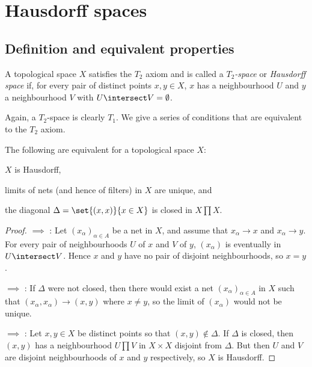 \documentclass[article, a4paper, 11pt, oneside]{memoir}
\numberwithin{equation}{chapter}
\begin{document}
\chapter{Hausdorff spaces}

\section{Definition and equivalent properties}

\begin{definition}
    A topological space $X$ satisfies the $T_2$ axiom and is called a \emph{$T_2$-space} or \emph{Hausdorff space} if, for every pair of distinct points $x,y \in X$, $x$ has a neighbourhood $U$ and $y$ a neighbourhood $V$ with $U \intersect V = \emptyset$.
\end{definition}
%
Again, a $T_2$-space is clearly $T_1$. We give a series of conditions that are equivalent to the $T_2$ axiom.


\begin{proposition}
    \label{thm:Hausdorff-equivalent-properties}
    The following are equivalent for a topological space $X$:
    \begin{enumprop}
        \item \label{enum:T2-space} $X$ is Hausdorff,
        \item \label{enum:T2-limits_unique} limits of nets (and hence of filters) in $X$ are unique, and
        \item \label{enum:T2-closed_diagonal} the diagonal $\Delta = \set{(x,x)}{x \in X}$ is closed in $X \prod X$.
    \end{enumprop}
\end{proposition}

\begin{proof}
     $\implies$ : Let $(x_\alpha)_{\alpha \in A}$ be a net in $X$, and assume that $x_\alpha \to x$ and $x_\alpha \to y$. For every pair of neighbourhoods $U$ of $x$ and $V$ of $y$, $(x_\alpha)$ is eventually in $U \intersect V$. Hence $x$ and $y$ have no pair of disjoint neighbourhoods, so $x = y$.

     $\implies$ : If $\Delta$ were not closed, then there would exist a net $(x_\alpha)_{\alpha \in A}$ in $X$ such that $(x_\alpha, x_\alpha) \to (x,y)$ where $x \neq y$, so the limit of $(x_\alpha)$ would not be unique.

     $\implies$ : Let $x,y \in X$ be distinct points so that $(x,y) \not\in \Delta$. If $\Delta$ is closed, then $(x,y)$ has a neighbourhood $U \prod V$ in $X \times X$ disjoint from $\Delta$. But then $U$ and $V$ are disjoint neighbourhoods of $x$ and $y$ respectively, so $X$ is Hausdorff.
\end{proof}
\end{document}
